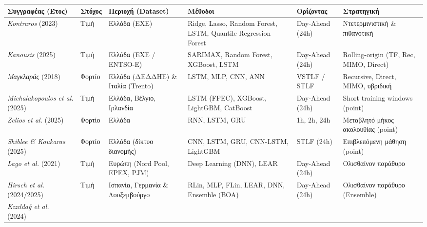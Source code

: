 \begin{landscape}
\vspace{2pt}
\begin{center}
  \scriptsize
  \setlength{\tabcolsep}{5pt}
  \renewcommand{\arraystretch}{1.1}
  \begin{tabular}{p{3.0cm}p{1.5cm}p{3.4cm}p{6.2cm}p{2.6cm}p{5.8cm}}
    \toprule
    \textbf{Συγγραφέας (Έτος)} & \textbf{Στόχος} & \textbf{Περιοχή (Dataset)} & \textbf{Μέθοδοι} & \textbf{Ορίζοντας} & \textbf{Στρατηγική} \\
    \midrule
    \textit{Kontraros} (2023)~\cite{kontraros2023}
      & Τιμή & Ελλάδα (ΕΧΕ)
      & Ridge, Lasso, Random Forest, LSTM, Quantile Regression Forest
      & Day-Ahead (24h) & Ντετερμινιστική \& πιθανοτική \\
    \addlinespace[4pt]
    \textit{Kanousis} (2025)~\cite{kanousis2025}
      & Τιμή & Ελλάδα (ΕΧΕ / ENTSO-E)
      & SARIMAX, Random Forest, XGBoost, LSTM
      & Day-Ahead (24h) & Rolling-origin (TF, Rec, MIMO, Direct) \\
    \addlinespace[4pt]
    \textit{Μαγκλαράς} (2018)~\cite{magklaras2018}
      & Φορτίο & Ελλάδα (ΔΕΔΔΗΕ) \& Ιταλία (Trento)
      & LSTM, MLP, CNN, ANN
      & VSTLF / STLF & Recursive, Direct, MIMO, υβριδική \\
    \addlinespace[4pt]
    \textit{Michalakopoulos et al.} (2025)~\cite{ntua2025shortwindow}
      & Τιμή & Ελλάδα, Βέλγιο, Ιρλανδία
      & LSTM (FFEC), XGBoost, LightGBM, CatBoost
      & Day-Ahead (24h) & Short training windows (point) \\
    \addlinespace[4pt]
    \textit{Zelios et al.} (2025)~\cite{zelios2025shortterm}
      & Φορτίο & Ελλάδα
      & RNN, LSTM, GRU
      & 1h, 2h, 24h & Μεταβλητό μήκος ακολουθίας (point) \\
    \addlinespace[4pt]
    \textit{Shiblee \& Koukaras} (2025)~\cite{shiblee2025shortterm}
      & Φορτίο & Ελλάδα (δίκτυο διανομής)
      & CNN, LSTM, GRU, CNN-LSTM, LightGBM
      & STLF (24h) & Επιβλεπόμενη μάθηση (point) \\
    \addlinespace[4pt]
    \textit{Lago et al.} (2021)~\cite{lago2021}
      & Τιμή & Ευρώπη (Nord Pool, EPEX, PJM)
      & Deep Learning (DNN), LEAR
      & Day-Ahead (24h) & Ολισθαίνον παράθυρο \\
    \addlinespace[4pt]
    \textit{Hirsch et al.} (2024/2025)
      & Τιμή & Ισπανία, Γερμανία \& Λουξεμβούργο
      & RLin, MLP, FLin, LEAR, DNN, Ensemble (BOA)
      & Day-Ahead (24h) & Ολισθαίνον παράθυρο (Ensemble) \\
    \addlinespace[4pt]
    \textit{Kızıldağ et al.} (2024)~\cite{kizildag2024development}

\end{tabular}
\end{center}
\end{landscape}
